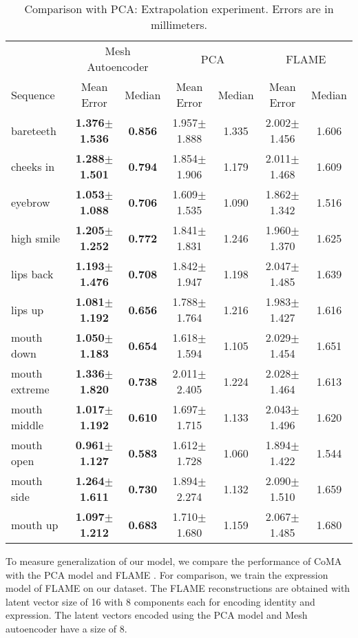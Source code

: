 \begin{table}[t]
\begin{center}
\caption{Comparison with PCA: Extrapolation experiment. Errors are in millimeters.}
\begin{tabular}{l|cc|cc|cc}
&  \multicolumn{2}{|c}{Mesh Autoencoder} & \multicolumn{2}{|c}{PCA} & \multicolumn{2}{|c}{FLAME \cite{FLAME2017}} \\
Sequence   &  Mean Error & Median & Mean Error & Median & Mean Error & Median \\ \hline
bareteeth & \textbf{1.376$\pm$1.536} & \textbf{0.856}  &1.957$\pm$1.888 & 1.335 & 2.002$\pm$1.456 & 1.606 \\
cheeks in & \textbf{1.288$\pm$1.501} & \textbf{0.794}  &1.854$\pm$1.906 & 1.179 & 2.011$\pm$1.468 & 1.609 \\
eyebrow &  \textbf{1.053$\pm$1.088} & \textbf{0.706} &1.609$\pm$1.535 & 1.090 & 1.862$\pm$1.342 & 1.516 \\
high smile & \textbf{1.205$\pm$1.252} & \textbf{0.772} & 1.841$\pm$1.831 & 1.246 & 1.960$\pm$1.370 & 1.625 \\
lips back & \textbf{1.193$\pm$1.476} & \textbf{0.708} & 1.842$\pm$1.947 & 1.198 & 2.047$\pm$1.485 & 1.639 \\
lips up & \textbf{1.081$\pm$1.192} & \textbf{0.656} & 1.788$\pm$1.764 & 1.216 & 1.983$\pm$1.427 & 1.616 \\
mouth down & \textbf{1.050$\pm$1.183} & \textbf{0.654} & 1.618$\pm$1.594 & 1.105 & 2.029$\pm$1.454 & 1.651 \\
mouth extreme &\textbf{1.336$\pm$1.820} & \textbf{0.738}  & 2.011$\pm$2.405 & 1.224 & 2.028$\pm$1.464 & 1.613 \\
mouth middle & \textbf{1.017$\pm$1.192} & \textbf{0.610}  &1.697$\pm$1.715 & 1.133 & 2.043$\pm$1.496 & 1.620 \\
mouth open & \textbf{0.961$\pm$1.127} & \textbf{0.583}  &1.612$\pm$1.728 & 1.060 & 1.894$\pm$1.422 & 1.544 \\
mouth side &  \textbf{1.264$\pm$1.611} & \textbf{0.730}  &1.894$\pm$2.274 & 1.132& 2.090$\pm$1.510 & 1.659 \\
mouth up & \textbf{1.097$\pm$1.212} & \textbf{0.683}  &1.710$\pm$1.680 & 1.159 & 2.067$\pm$1.485 & 1.680
\end{tabular}
\vspace{-4mm}
\label{tab:extrap}
\end{center}
\end{table}

 To measure generalization of our model, we compare the performance of CoMA with the PCA model and FLAME \cite{FLAME2017}. For comparison, we train the expression model of FLAME on our dataset. The FLAME reconstructions are obtained with latent vector size of 16 with 8 components each for encoding identity and expression. The latent vectors encoded using the PCA model and Mesh autoencoder have a size of 8.

